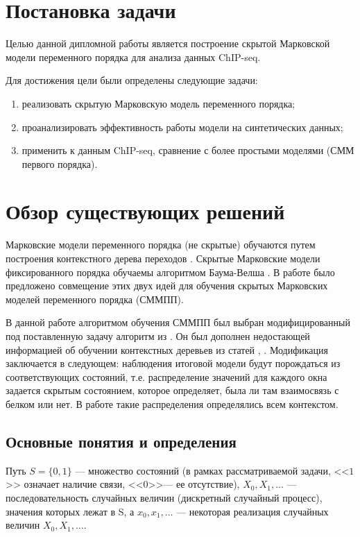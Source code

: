 \documentclass{matmex-diploma-custom}
\begin{document}
\section{Постановка задачи}
Целью данной дипломной работы является построение скрытой Марковской модели переменного
порядка для анализа данных ChIP-seq.

Для достижения цели были определены следующие задачи:
\begin{enumerate}
\item
реализовать скрытую Марковскую модель
переменного порядка;
\item
проанализировать 
эффективность работы модели на синтетических
данных;
\item
применить к данным ChIP-seq, сравнение с более простыми моделями (СММ
первого порядка).
\end{enumerate}


\section{Обзор существующих решений}
Марковские модели переменного порядка (не скрытые) обучаются путем построения контекстного дерева переходов \cite{Buhlmann1999}. Скрытые Марковские модели фиксированного порядка обучаемы алгоритмом Баума-Велша \cite{Rabiner1989}.
В работе \cite{Wang2006} было предложено совмещение этих двух идей для обучения скрытых Марковских моделей переменного порядка (СММПП).

В данной работе алгоритмом обучения СММПП был выбран модифицированный под поставленную задачу алгоритм  из \cite{Wang2006}. Он был дополнен недостающей информацией об обучении контекстных деревьев из статей \cite{Buhlmann1999}, \cite{Dumont2014}.
Модификация заключается в следующем: наблюдения итоговой модели будут порождаться из соответствующих состояний, т.е. распределение значений для каждого окна задается скрытым состоянием, которое определяет, была ли там взаимосвязь с белком или нет. В работе \cite{Wang2006} такие распределения определялись всем контекстом. 

\subsection{Основные понятия и определения}

Путь 
$ S = \{0, 1\} $ --- множество состояний (в рамках рассматриваемой задачи, <<$1$>> означает наличие связи, <<$0$>>--- ее отсутствие), 
$X_0, X_1, \ldots $ --- последовательность случайных величин (дискретный случайный процесс), значения которых лежат в S, а
$x_0, x_1, \ldots$ --- некоторая реализация случайных величин $X_0, X_1, \ldots $.
\end{document}
